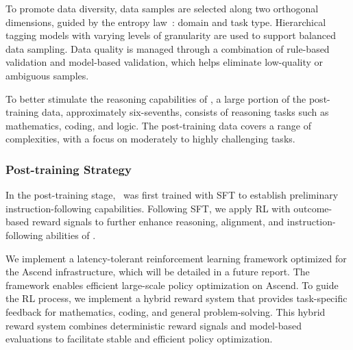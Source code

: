 To promote data diversity, data samples are selected along two orthogonal dimensions, guided by the entropy law~\cite{yin2024entropy}: domain and task type. 
Hierarchical tagging models with varying levels of granularity are used to support balanced data sampling. 
Data quality is managed through a combination of rule-based validation and model-based validation, which helps eliminate low-quality or ambiguous samples.

To better stimulate the reasoning capabilities of \modelname, a large portion of the post-training data, approximately six-sevenths, consists of reasoning tasks such as mathematics, coding, and logic. 
The post-training data covers a range of complexities, with a focus on moderately to highly challenging tasks.



\subsubsection{Post-training Strategy}
In the post-training stage, \modelname~was first trained with SFT to establish preliminary instruction-following capabilities.
Following SFT, we apply RL with outcome-based reward signals to further enhance reasoning, alignment, and instruction-following abilities of \modelname.


We implement a latency-tolerant reinforcement learning framework optimized for the Ascend infrastructure, which will be detailed in a future report.
The framework enables efficient large-scale policy optimization on Ascend.
To guide the RL process, we implement a hybrid reward system that provides task-specific feedback for mathematics, coding, and general problem-solving. 
This hybrid reward system combines deterministic reward signals and model-based evaluations to facilitate stable and efficient policy optimization.


